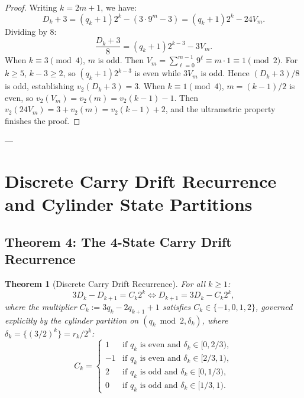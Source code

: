 \documentclass[11pt,reqno]{amsart}
\newtheorem{theorem}{Theorem}[section]
\theoremstyle{definition}
\numberwithin{equation}{section}
\begin{document}
\begin{proof}
Writing $k = 2m + 1$, we have:
\[
D_k + 3 = (q_k + 1)2^k - (3 \cdot 9^m - 3) = (q_k + 1)2^k - 24 V_m.
\]
Dividing by $8$:
\[
\frac{D_k + 3}{8} = (q_k + 1)2^{k-3} - 3 V_m.
\]
When $k \equiv 3 \pmod 4$, $m$ is odd. Then $V_m = \sum_{\ell=0}^{m-1} 9^\ell \equiv m \cdot 1 \equiv 1 \pmod 2$.
For $k \ge 5$, $k - 3 \ge 2$, so $(q_k + 1)2^{k-3}$ is even while $3 V_m$ is odd.
Hence $(D_k + 3)/8$ is odd, establishing $v_2(D_k + 3) = 3$.
When $k \equiv 1 \pmod 4$, $m = (k-1)/2$ is even, so $v_2(V_m) = v_2(m) = v_2(k-1) - 1$.
Then $v_2(24 V_m) = 3 + v_2(m) = v_2(k-1) + 2$, and the ultrametric property finishes the proof.
\end{proof}

---

\section{Discrete Carry Drift Recurrence and Cylinder State Partitions}

\subsection{Theorem 4: The 4-State Carry Drift Recurrence}

\begin{theorem}[Discrete Carry Drift Recurrence]\label{thm:carry_drift}
For all $k \ge 1$:
\begin{equation}\label{eq:drift_equation}
3 D_k - D_{k+1} = C_k 2^k \iff D_{k+1} = 3 D_k - C_k 2^k,
\end{equation}
where the multiplier $C_k := 3 q_k - 2 q_{k+1} + 1$ satisfies $C_k \in \{-1, 0, 1, 2\}$, governed explicitly by the cylinder partition on $(q_k \bmod 2, \delta_k)$, where $\delta_k = \{(3/2)^k\} = r_k / 2^k$:
\begin{equation}\label{eq:state_partition}
C_k = \begin{cases}
1 & \text{if } q_k \text{ is even and } \delta_k \in [0, 2/3), \\
-1 & \text{if } q_k \text{ is even and } \delta_k \in [2/3, 1), \\
2 & \text{if } q_k \text{ is odd and } \delta_k \in [0, 1/3), \\
0 & \text{if } q_k \text{ is odd and } \delta_k \in [1/3, 1).
\end{cases}
\end{equation}
\end{theorem}
\end{document}
